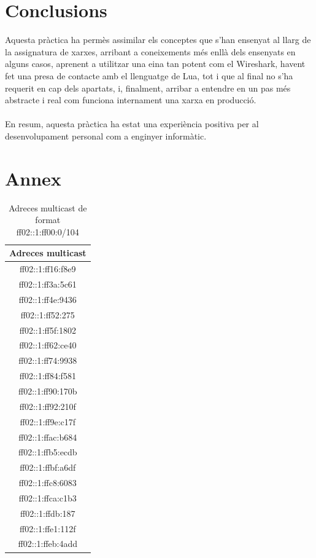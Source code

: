 \documentclass{article}
\begin{document}
\section{Conclusions}
Aquesta pràctica ha permès assimilar els conceptes que s'han ensenyat
al llarg de la assignatura de xarxes, arribant a coneixements més enllà
dels ensenyats en alguns casos, aprenent a utilitzar una eina tan potent
com el Wireshark, havent fet una presa de contacte amb el llenguatge de Lua,
tot i que al final no s'ha requerit en cap dels apartats, i, finalment, arribar
a entendre en un pas més abstracte i real com funciona internament una xarxa
en producció.\\
\\
En resum, aquesta pràctica ha estat una experiència positiva per al desenvolupament
personal com a enginyer informàtic.
\newpage
\section{Annex}
\begin{table}[!h]
\centering
\begin{tabular}{c}
Adreces multicast\\
\hline
ff02::1:ff16:f8e9\\
ff02::1:ff3a:5c61\\
ff02::1:ff4e:9436\\
ff02::1:ff52:275\\
ff02::1:ff5f:1802\\
ff02::1:ff62:ce40\\
ff02::1:ff74:9938\\
ff02::1:ff84:f581\\
ff02::1:ff90:170b\\
ff02::1:ff92:210f\\
ff02::1:ff9e:c17f\\
ff02::1:ffac:b684\\
ff02::1:ffb5:ecdb\\
ff02::1:ffbf:a6df\\
ff02::1:ffc8:6083\\
ff02::1:ffca:c1b3\\
ff02::1:ffdb:187\\
ff02::1:ffe1:112f\\
ff02::1:ffeb:4add\\
\end{tabular}
\caption{Adreces multicast de format ff02::1:ff00:0/104}
\label{mult:104}
\end{table}
\end{document}
